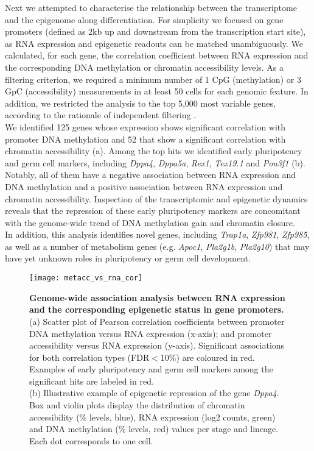 Next we attempted to characterise the relationship between the transcriptome and the epigenome along differentiation. For simplicity we focused on gene promoters (defined as 2kb up and downstream from the transcription start site), as RNA expression and epigenetic readouts can be matched unambiguously. We calculated, for each gene, the correlation coefficient between RNA expression and the corresponding DNA methylation or chromatin accessibility levels. As a filtering criterion, we required a minimum number of 1 CpG
(methylation) or 3 GpC (accessibility) measurements in at least 50 cells for each genomic feature. In addition, we restricted the analysis to the top 5,000 most variable genes, according to the rationale of independent filtering \cite{Bourgon2010}.\\
We identified 125 genes whose expression shows significant correlation with promoter DNA methylation and 52 that show a significant correlation with chromatin accessibility (a). Among the top hits we identified early pluripotency and germ cell markers, including \textit{Dppa4}, \textit{Dppa5a}, \textit{Rex1}, \textit{Tex19.1} and \textit{Pou3f1} (b). Notably, all of them have a negative association between RNA expression and DNA methylation and a positive association between RNA expression and chromatin accessibility. Inspection of the transcriptomic and epigenetic dynamics reveals that the repression of these early pluripotency markers are concomitant with the genome-wide trend of DNA methylation gain and chromatin closure.\\
In addition, this analysis identifies novel genes, including \textit{Trap1a}, \textit{Zfp981}, \textit{Zfp985}, as well as a number of metabolism genes (e.g. \textit{Apoc1}, \textit{Pla2g1b}, \textit{Pla2g10}) that may have yet unknown roles in pluripotency or germ cell development.

\begin{figure}[H]
	\centering
	\texttt{[image: metacc\_vs\_rna\_cor]}
	\caption[]{\textbf{Genome-wide association analysis between RNA expression and the corresponding epigenetic status in gene promoters.}\\
	(a) Scatter plot of Pearson correlation coefficients between promoter DNA methylation versus RNA expression (x-axis); and promoter accessibility versus RNA expression (y-axis). Significant associations for both correlation types (FDR$<$10\%) are coloured in red. Examples of early pluripotency and germ cell markers among the significant hits are labeled in red.\\
	(b) Illustrative example of epigenetic repression of the gene \textit{Dppa4}. Box and violin plots display the distribution of chromatin accessibility (\% levels, blue), RNA expression (log2 counts, green) and DNA methylation (\% levels, red) values per stage and lineage. Each dot corresponds to one cell.
	}
	\label{fig:metacc_vs_rna_cor}
\end{figure}

